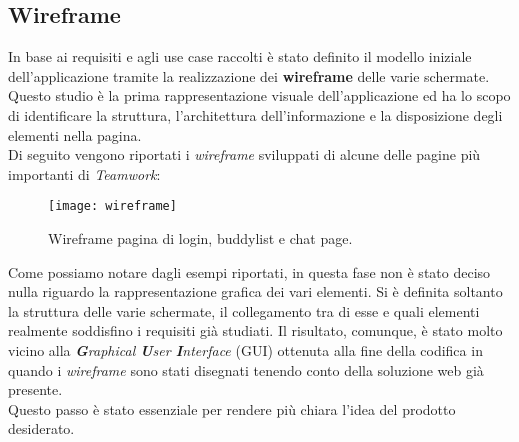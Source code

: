 \subsection{Wireframe}
In base ai requisiti e agli use case raccolti è stato definito il modello iniziale
 dell'applicazione tramite la realizzazione dei \textbf{wireframe} delle varie schermate. \\
Questo studio è la prima rappresentazione visuale dell'applicazione ed ha lo 
scopo di identificare la struttura, l'architettura dell'informazione e la 
disposizione degli elementi nella pagina.\\
Di seguito vengono riportati i \emph{wireframe} sviluppati di alcune delle pagine più 
importanti di \emph{Teamwork}:
\begin{figure}[H] 
	\centering
	\texttt{[image: wireframe]}
	\caption{Wireframe pagina di login, buddylist e chat page.}
\end{figure}
Come possiamo notare dagli esempi riportati, in questa fase non è stato deciso 
nulla riguardo la rappresentazione grafica dei vari elementi. 
Si è definita soltanto la struttura delle varie schermate, il collegamento tra 
di esse e quali elementi realmente soddisfino i requisiti già studiati. 
Il risultato, comunque, è stato molto vicino alla \emph{\textbf{G}raphical \textbf{U}ser \textbf{I}nterface} (\acrshort{GUI}) ottenuta alla fine della 
codifica in quando i \emph{wireframe} sono stati disegnati tenendo conto della 
soluzione web già presente.\\ 
Questo passo è stato essenziale per rendere più chiara l'idea del prodotto desiderato.

